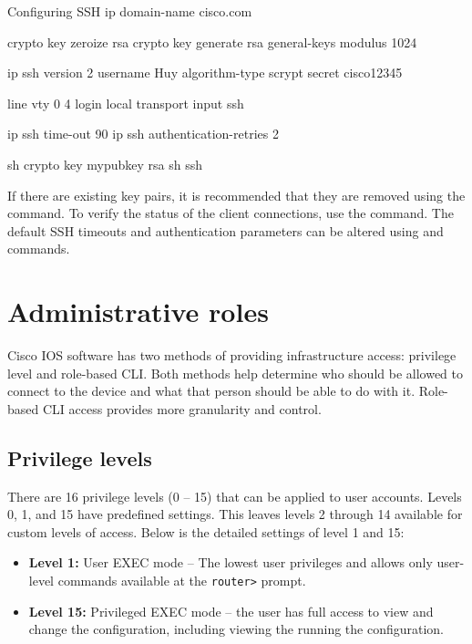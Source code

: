 \begin{sexylisting}{Configuring SSH}
ip domain-name cisco.com

crypto key zeroize rsa
crypto key generate rsa general-keys modulus 1024

ip ssh version 2
username Huy algorithm-type scrypt secret cisco12345

line vty 0 4
  login local
  transport input ssh

ip ssh time-out 90
ip ssh authentication-retries 2

sh crypto key mypubkey rsa
sh ssh
\end{sexylisting}

If there are existing key pairs, it is recommended that they are removed using the  command. To verify the status of the client connections, use the  command. The default SSH timeouts and authentication parameters can be altered using  and  commands.

\section{Administrative roles}

Cisco IOS software has two methods of providing infrastructure access: privilege level and role-based CLI. Both methods help determine who should be allowed to connect to the device and what that person should be able to do with it. Role-based CLI access provides more granularity and control.

\subsection{Privilege levels}

There are 16 privilege levels (0 -- 15) that can be applied to user accounts. Levels 0, 1, and 15 have predefined settings. This leaves levels 2 through 14 available for custom levels of access. Below is the detailed settings of level 1 and 15:

\begin{itemize}
\item \textbf{Level 1:} User EXEC mode -- The lowest user privileges and allows only user-level commands available at the \verb|router>| prompt.
\item \textbf{Level 15:} Privileged EXEC mode -- the user has full access to view and change the configuration, including viewing the running the configuration.
\end{itemize}

